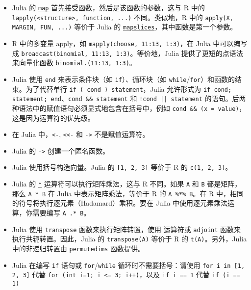 \begin{itemize}
\item Julia 的 \hyperlink{11483231213869150535}{\texttt{map}} 首先接受函数，然后是该函数的参数，这与 R 中的 \texttt{lapply(<structure>, function, ...)} 不同。类似地，R 中的 \texttt{apply(X, MARGIN, FUN, ...)} 等价于 Julia 的 \hyperlink{8678396932318499078}{\texttt{mapslices}}，其中函数是第一个参数。


\item R 中的多变量 apply，如 \texttt{mapply(choose, 11:13, 1:3)}，在 Julia 中可以编写成 \texttt{broadcast(binomial, 11:13, 1:3)}。等价地，Julia 提供了更短的点语法来向量化函数 \texttt{binomial.(11:13, 1:3)}。


\item Julia 使用 \texttt{end} 来表示条件块（如 \texttt{if}）、循环块（如 \texttt{while}/\texttt{for}）和函数的结束。为了代替单行 \texttt{if ( cond ) statement}，Julia 允许形式为 \texttt{if cond; statement; end}、\texttt{cond \&\& statement} 和 \texttt{!cond || statement} 的语句。后两种语法中的赋值语句必须显式地包含在括号中，例如 \texttt{cond \&\& (x = value)}，这是因为运算符的优先级。


\item 在 Julia 中，\texttt{<-}, \texttt{<<-} 和 \texttt{->} 不是赋值运算符。


\item Julia 的 \texttt{->} 创建一个匿名函数。


\item Julia 使用括号构造向量。Julia 的 \texttt{[1, 2, 3]} 等价于 R 的 \texttt{c(1, 2, 3)}。


\item Julia 的 \hyperlink{5498506958944335098}{\texttt{*}} 运算符可以执行矩阵乘法，这与 R 不同。如果 \texttt{A} 和 \texttt{B} 都是矩阵，那么 \texttt{A * B} 在 Julia 中表示矩阵乘法，等价于 R 的 \texttt{A \%*\% B}。在 R 中，相同的符号将执行逐元素（Hadamard）乘积。要在 Julia 中使用逐元素乘法运算，你需要编写 \texttt{A .* B}。


\item Julia 使用 \texttt{transpose} 函数来执行矩阵转置，使用 \texttt{{\textquotesingle}} 运算符或 \texttt{adjoint} 函数来执行共轭转置。因此，Julia 的 \texttt{transpose(A)} 等价于 R 的 \texttt{t(A)}。另外，Julia 中的非递归转置由 \texttt{permutedims} 函数提供。


\item Julia 在编写 \texttt{if} 语句或 \texttt{for}/\texttt{while} 循环时不需要括号：请使用 \texttt{for i in [1, 2, 3]} 代替 \texttt{for (int i=1; i <= 3; i++)}，以及 \texttt{if i == 1} 代替 \texttt{if (i == 1)}



\end{itemize}
